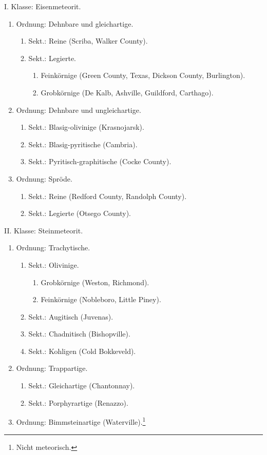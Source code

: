 \documentclass[a4paper, 11pt, oneside]{article}
\begin{document}
\begin{center}
I. Klasse: Eisenmeteorit.
\end{center}
\begin{enumerate}
  \item Ordnung: Dehnbare und gleichartige.
  \begin{enumerate}
    \item Sekt.: Reine (Scriba, Walker County).
    \item Sekt.: Legierte.
    \begin{enumerate}
      \item Feinkörnige (Green County, Texas, Dickson County, Burlington).
      \item Grobkörnige (De Kalb, Ashville, Guildford, Carthago).
    \end{enumerate}
  \end{enumerate}
  \item Ordnung: Dehnbare und ungleichartige.
  \begin{enumerate}
    \item Sekt.: Blasig-olivinige (Krasnojarsk).
    \item Sekt.: Blasig-pyritische (Cambria).
    \item Sekt.: Pyritisch-graphitische (Cocke County).
  \end{enumerate}
  \item Ordnung: Spröde.
  \begin{enumerate}
    \item Sekt.: Reine (Redford County, Randolph County).
    \item Sekt.: Legierte (Otsego County).
  \end{enumerate}
\end{enumerate}

\begin{center}
II. Klasse: Steinmeteorit.
\end{center}
\begin{enumerate}
  \item Ordnung: Trachytische.
  \begin{enumerate}
    \item Sekt.: Olivinige.
    \begin{enumerate}
      \item Grobkörnige (Weston, Richmond).
      \item Feinkörnige (Nobleboro, Little Piney).
    \end{enumerate}
    \item Sekt.: Augitisch (Juvenas).
    \item Sekt.: Chadnitisch (Bishopville).
    \item Sekt.: Kohligen (Cold Bokkeveld).
  \end{enumerate}
  \item Ordnung: Trappartige.
  \begin{enumerate}
    \item Sekt.: Gleichartige (Chantonnay).
    \item Sekt.: Porphyrartige (Renazzo).
  \end{enumerate}
  \item Ordnung: Bimmsteinartige (Waterville).\footnote{Nicht meteorisch.}
\end{enumerate}
\end{document}
